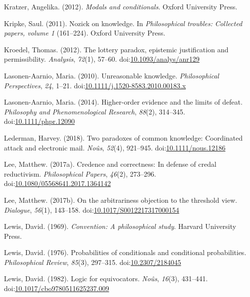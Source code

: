 \documentclass[
  10pt,
  letterpaper,
  twoside]{scrbook}
\newlength{\cslhangindent}
\newenvironment{CSLReferences}[2] %
 {\begin{list}{}{%
  \setlength{\itemindent}{0pt}
  \setlength{\leftmargin}{0pt}
  \setlength{\parsep}{0pt}
  \ifodd #1
   \setlength{\leftmargin}{\cslhangindent}
   \setlength{\itemindent}{-1\cslhangindent}
  \fi
  \setlength{\itemsep}{#2\baselineskip}}}
 {\end{list}}
\begin{document}
\begin{CSLReferences}{1}{0}
Kratzer, Angelika. (2012). \emph{Modals and conditionals}. Oxford
University Press.

Kripke, Saul. (2011). Nozick on knowledge. In \emph{Philosophical
troubles: Collected papers, volume 1} (161--224). {O}xford {U}niversity
{P}ress.

Kroedel, Thomas. (2012). The lottery paradox, epistemic justification
and permissibility. \emph{Analysis}, \emph{72}(1), 57--60.
doi:\href{https://doi.org/10.1093/analys/anr129}{10.1093/analys/anr129}

Lasonen-Aarnio, Maria. (2010). Unreasonable knowledge.
\emph{Philosophical Perspectives}, \emph{24}, 1--21.
doi:\href{https://doi.org/10.1111/j.1520-8583.2010.00183.x}{10.1111/j.1520-8583.2010.00183.x}

Lasonen-Aarnio, Maria. (2014). Higher-order evidence and the limits of
defeat. \emph{Philosophy and Phenomenological Research}, \emph{88}(2),
314--345.
doi:\href{https://doi.org/10.1111/phpr.12090}{10.1111/phpr.12090}

Lederman, Harvey. (2018). Two paradoxes of common knowledge: Coordinated
attack and electronic mail. \emph{No{û}s}, \emph{52}(4), 921--945.
doi:\href{https://doi.org/10.1111/nous.12186}{10.1111/nous.12186}

Lee, Matthew. (2017a). Credence and correctness: In defense of credal
reductivism. \emph{Philosophical Papers}, \emph{46}(2), 273--296.
doi:\href{https://doi.org/10.1080/05568641.2017.1364142}{10.1080/05568641.2017.1364142}

Lee, Matthew. (2017b). On the arbitrariness objection to the threshold
view. \emph{Dialogue}, \emph{56}(1), 143--158.
doi:\href{https://doi.org/10.1017/S0012217317000154}{10.1017/S0012217317000154}

Lewis, David. (1969). \emph{Convention: A philosophical study}. Harvard
University Press.

Lewis, David. (1976). Probabilities of conditionals and conditional
probabilities. \emph{Philosophical Review}, \emph{85}(3), 297--315.
doi:\href{https://doi.org/10.2307/2184045}{10.2307/2184045}

Lewis, David. (1982). Logic for equivocators. \emph{No{û}s},
\emph{16}(3), 431--441.
doi:\href{https://doi.org/10.1017/cbo9780511625237.009}{10.1017/cbo9780511625237.009}


\end{CSLReferences}
\end{document}
